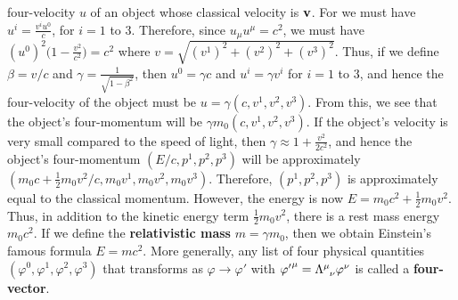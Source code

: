 {four-velocity $u$ of an object whose classical velocity is $\vb{v}$. For we must have $u^i=\frac{v^i u^0}{c}$, for $i=1$ to $3$. Therefore, since $u_\mu u^\mu=c^2$, we must have $(u^0)^2\big(1-\frac{v^2}{c^2}\big)=c^2$ where $v=\sqrt{({v}^1)^2+({v}^2)^2+({v}^3)^2}$. Thus, if we define $\beta={v}/{c}$ and $\gamma=\frac{1}{\sqrt{1-\beta^2}}$, then $u^0=\gamma c$ and $u^i=\gamma v^i$ for $i=1$ to $3$, and hence the four-velocity of the object must be $u=\gamma(c,v^1,v^2,v^3).$ From this, we see that the object's four-momentum will be $\gamma m_0(c,v^1,v^2,v^3).$ If the object's velocity is very small compared to the speed of light, then $\gamma\approx 1+\frac{v^2}{2c^2}$, and hence the object's four-momentum $(E/c, p^1, p^2, p^3)$ will be approximately $(m_0c+\frac{1}{2}m_0{v^2}/c, m_0v^1,m_0v^2,m_0v^3)$. Therefore, $(p^1, p^2, p^3)$ is approximately equal to the classical momentum. However, the energy is now $E=m_0c^2+\frac{1}{2}m_0{v^2}$. Thus, in addition to the kinetic energy term $\frac{1}{2}m_0{v^2}$, there is a rest mass energy $m_0c^2$. If we define the \textbf{relativistic mass} $m=\gamma m_0$, then we obtain Einstein's famous formula $E=mc^2$.  } More generally, any list of four physical quantities $(\varphi^0, \varphi^1, \varphi^2, \varphi^3)$ that transforms as $\varphi\rightarrow\varphi'$ with  ${\varphi'}^\mu=\Lambda\indices{^\mu_\nu}\varphi^\nu$ is called a \textbf{four-vector}.   
